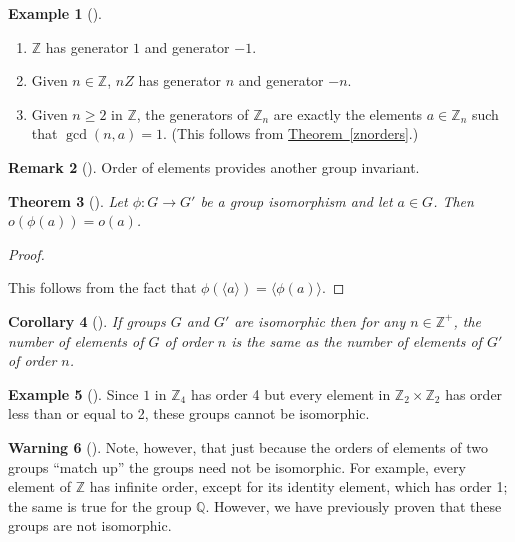 \documentclass[10pt,]{book}
\theoremstyle{plain}
\newtheorem{theorem}{Theorem}[section]
\newtheorem{corollary}[theorem]{Corollary}
\theoremstyle{definition}
\theoremstyle{definition}
\newtheorem{remark}[theorem]{Remark}
\newtheorem{warning}[theorem]{Warning}
\theoremstyle{definition}
\newtheorem{example}[theorem]{Example}
\theoremstyle{definition}
\numberwithin{equation}{section}
\def\Z{\mathbb{Z}}
\def\Q{\mathbb{Q}}
\begin{document}
\begin{example}[]\label{example-44}
\leavevmode%
\begin{enumerate}
\item\hypertarget{li-275}{}\(\Z\) has generator \(1\) and generator \(-1\).%
\item\hypertarget{li-276}{}Given \(n\in \Z\), \(nZ\) has generator \(n\) and generator \(-n\).%
\item\hypertarget{li-277}{}Given \(n\geq 2\) in \(\Z\), the generators of \(\Z_n\) are exactly  the elements \(a\in \Z_n\) such that \(\gcd(n,a)=1\). (This follows from \hyperref[znorders]{Theorem~\ref{znorders}}.)%
\end{enumerate}
\end{example}
\begin{remark}[]\label{remark-22}
Order of elements provides another group invariant.%
\end{remark}
\begin{theorem}[{}]\label{ophia}
Let \(\phi:G\to G'\) be a group isomorphism and let \(a\in G\). Then \(o(\phi(a))=o(a)\).%
\end{theorem}
\begin{proof}\hypertarget{proof-26}{}
This follows from the fact that \(\phi(\langle a\rangle )=\langle \phi(a)\rangle\).%
\end{proof}
\begin{corollary}[{}]\label{corollary-4}
If groups \(G\) and \(G'\) are isomorphic then for any \(n\in \Z^+\), the number of elements of \(G\) of order \(n\) is the same as the number of elements of \(G'\) of order \(n\).%
\end{corollary}
\begin{example}[]\label{example-45}
Since \(1\) in \(\Z_4\) has order 4 but every element in \(\Z_2 \times \Z_2\) has order less than or equal to 2, these groups cannot be isomorphic.%
\end{example}
\begin{warning}[]\label{warning-18}
Note, however, that just because the orders of elements of two groups ``match up'' the groups need not be isomorphic. For example, every element of \(\Z\) has infinite order, except for its identity element, which has order 1; the same is true for the group \(\Q\). However, we have previously proven that these groups are not isomorphic.%
\end{warning}
\typeout{************************************************}
\typeout{************************************************}
\end{document}
